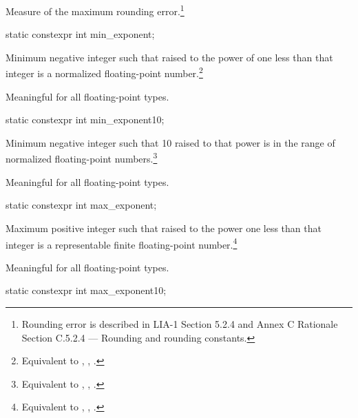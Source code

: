 \begin{itemdescr}
\pnum
Measure of the maximum rounding error.\footnote{Rounding error is described in
LIA-1
Section 5.2.4 and
Annex C Rationale Section C.5.2.4 --- Rounding and rounding constants.}
\end{itemdescr}

%
\begin{itemdecl}
static constexpr int  min_exponent;
\end{itemdecl}

\begin{itemdescr}
\pnum
Minimum negative integer such that
raised to the power of one less than that integer is a normalized floating-point
number.\footnote{Equivalent to , ,
.}

\pnum
Meaningful for all floating-point types.
\end{itemdescr}

%
\begin{itemdecl}
static constexpr int  min_exponent10;
\end{itemdecl}

\begin{itemdescr}
\pnum
Minimum negative integer such that 10 raised to that power is in the range
of normalized floating-point numbers.\footnote{Equivalent to
, , .}

\pnum
Meaningful for all floating-point types.
\end{itemdescr}

%
\begin{itemdecl}
static constexpr int  max_exponent;
\end{itemdecl}

\begin{itemdescr}
\pnum
Maximum positive integer such that
raised to the power one less than that integer is a representable finite
floating-point number.\footnote{Equivalent to ,
, .}

\pnum
Meaningful for all floating-point types.
\end{itemdescr}

%
\begin{itemdecl}
static constexpr int  max_exponent10;
\end{itemdecl}

